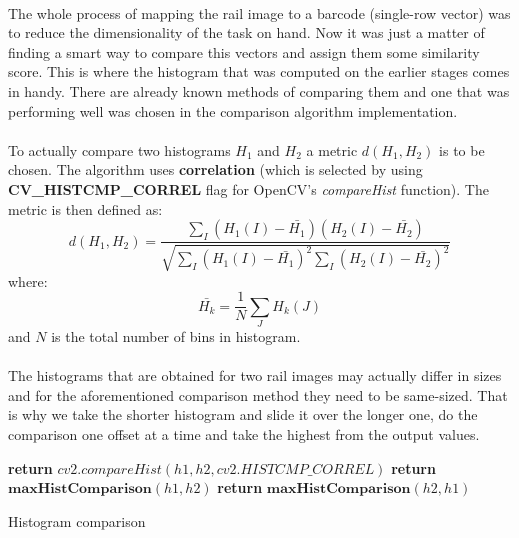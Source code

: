 \paragraph{}
The whole process of mapping the rail image to a barcode (single-row vector) was to reduce the dimensionality of the task on hand. Now it was just a matter of finding a smart way to compare this vectors and assign them some similarity score. This is where the histogram that was computed on the earlier stages comes in handy. There are already known methods of comparing them and one that was performing well was chosen in the comparison algorithm implementation.

\paragraph{}
To actually compare two histograms $H_1$ and $H_2$ a metric $d(H_1, H_2)$ is to be chosen. The algorithm uses \textbf{correlation} (which is selected by using \textbf{CV\_HISTCMP\_CORREL} flag for OpenCV's \textit{compareHist} function). The metric is then defined as:
\begin{equation}
	d(H_1, H_2) = \frac{\sum_I(H_1(I) - \bar{H_1})(H_2(I) - \bar{H_2})}{\sqrt{\sum_I(H_1(I) - \bar{H_1})^2 \sum_I(H_2(I) - \bar{H_2})^2}}
\end{equation}
where:
\begin{equation}
	\bar{H_k} = \frac{1}{N} \sum_J H_k(J)
\end{equation}
and $N$ is the total number of bins in histogram.

\paragraph{}
The histograms that are obtained for two rail images may actually differ in sizes and for the aforementioned comparison method they need to be same-sized. That is why we take the shorter histogram and slide it over the longer one, do the comparison one offset at a time and take the highest from the output values.

\begin{algorithm}
	\begin{spacing}{1.5}
	\begin{algorithmic}[1]
				\State \textbf{return} $cv2.compareHist(h1, h2, cv2.HISTCMP\_CORREL)$
				\State \textbf{return} $\textbf{maxHistComparison}(h1, h2)$
			\Else
				\State \textbf{return} $\textbf{maxHistComparison}(h2, h1)$
			\EndIf
		\EndFunction
	\end{algorithmic}
	\end{spacing}
	\caption{Histogram comparison}
	\label{alg:hist_comparison}
\end{algorithm}

